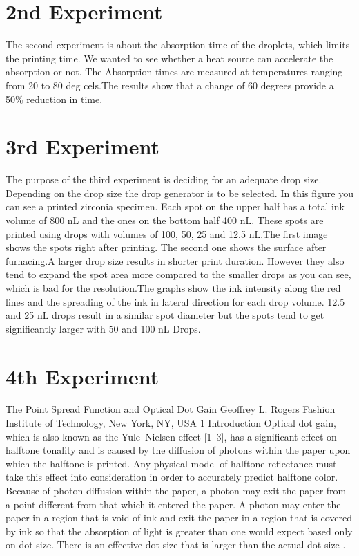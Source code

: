 \section{2nd Experiment}
The second experiment is about the absorption time of the droplets, which limits the printing time. We wanted to see whether a heat source can accelerate the absorption or not.
The Absorption times are measured at temperatures ranging from 20 to 80 deg cels.The results show that a change of 60 degrees provide a 50\% reduction in time.
\section{3rd Experiment}
The purpose of the third experiment is deciding for an adequate drop size. Depending on the drop size the drop generator is to be selected. In this figure you can see a printed zirconia specimen. Each spot on the upper half has a total ink volume of 800 nL and the ones on the bottom half 400 nL. These spots are printed using drops with volumes of 100, 50, 25 and 12.5 nL.The first image shows the spots right after printing. The second one shows the surface after furnacing.A larger drop size results in shorter print duration. However they also tend to expand the spot area more compared to the smaller drops as you can see, which is bad for the resolution.The graphs show the ink intensity along the red lines and the spreading of the ink in lateral direction for each drop volume. 12.5 and 25 nL drops result in a similar spot diameter but the spots tend to get significantly larger with 50 and 100 nL Drops.
\section{4th Experiment}

The Point Spread Function and
Optical Dot Gain
Geoffrey L. Rogers
Fashion Institute of Technology, New York, NY, USA
1  Introduction
Optical dot gain, which is also known as the Yule–Nielsen effect [1–3], has a significant
effect on halftone tonality and is caused by the diffusion of photons within the paper upon
which the halftone is printed. Any physical model of halftone reflectance must take this effect
into consideration in order to accurately predict halftone color.
Because of photon diffusion within the paper, a photon may exit the paper from a point
different from that which it entered the paper. A photon may enter the paper in a region that is
void of ink and exit the paper in a region that is covered by ink so that the absorption of light
is greater than one would expect based only on dot size. There is an effective dot size that is
larger than the actual dot size \citep{rogers2015point}.




